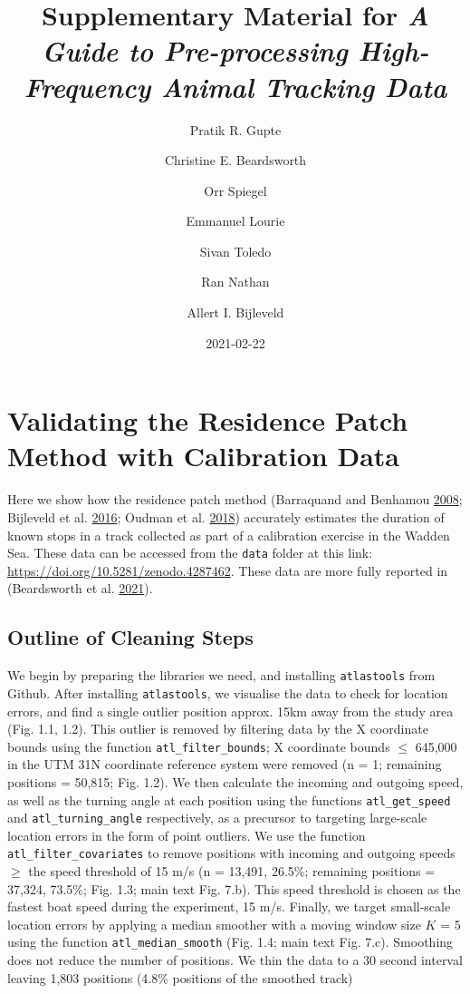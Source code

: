 \documentclass[]{scrreprt}
\title{Supplementary Material for \emph{A Guide to Pre-processing High-Frequency Animal Tracking Data}}
\author{Pratik R. Gupte \and Christine E. Beardsworth \and Orr Spiegel \and Emmanuel Lourie \and Sivan Toledo \and Ran Nathan \and Allert I. Bijleveld}
\date{2021-02-22}
\begin{document}
\maketitle

{
\setcounter{tocdepth}{1}
\tableofcontents
}
\hypertarget{validating-the-residence-patch-method-with-calibration-data}{%
\chapter{Validating the Residence Patch Method with Calibration Data}\label{validating-the-residence-patch-method-with-calibration-data}}

Here we show how the residence patch method (Barraquand and Benhamou \protect\hyperlink{ref-barraquand2008}{2008}; Bijleveld et al. \protect\hyperlink{ref-bijleveld2016}{2016}; Oudman et al. \protect\hyperlink{ref-oudman2018}{2018}) accurately estimates the duration of known stops in a track collected as part of a calibration exercise in the Wadden Sea. These data can be accessed from the \texttt{data} folder at this link: \url{https://doi.org/10.5281/zenodo.4287462}. These data are more fully reported in (Beardsworth et al. \protect\hyperlink{ref-beardsworth2021}{2021}).

\hypertarget{outline-of-cleaning-steps}{%
\section{Outline of Cleaning Steps}\label{outline-of-cleaning-steps}}

We begin by preparing the libraries we need, and installing \texttt{atlastools} from Github.
After installing \texttt{atlastools}, we visualise the data to check for location errors, and find a single outlier position approx. 15km away from the study area (Fig. 1.1, 1.2).
This outlier is removed by filtering data by the X coordinate bounds using the function \texttt{atl\_filter\_bounds}; X coordinate bounds \(\leq\) 645,000 in the UTM 31N coordinate reference system were removed (n = 1; remaining positions = 50,815; Fig. 1.2).
We then calculate the incoming and outgoing speed, as well as the turning angle at each position using the functions \texttt{atl\_get\_speed} and \texttt{atl\_turning\_angle} respectively, as a precursor to targeting large-scale location errors in the form of point outliers.
We use the function \texttt{atl\_filter\_covariates} to remove positions with incoming and outgoing speeds \(\geq\) the speed threshold of 15 m/s (n = 13,491, 26.5\%; remaining positions = 37,324, 73.5\%; Fig. 1.3; main text Fig. 7.b).
This speed threshold is chosen as the fastest boat speed during the experiment, 15 m/s.
Finally, we target small-scale location errors by applying a median smoother with a moving window size \(K\) = 5 using the function \texttt{atl\_median\_smooth} (Fig. 1.4; main text Fig. 7.c).
Smoothing does not reduce the number of positions.
We thin the data to a 30 second interval leaving 1,803 positions (4.8\% positions of the smoothed track)
\end{document}

